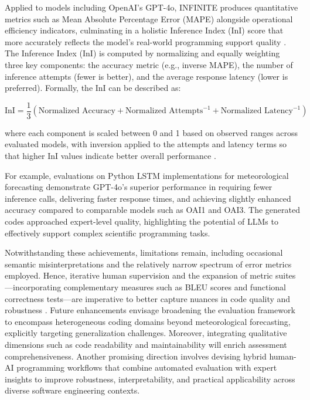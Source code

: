 \documentclass[sigconf]{acmart}
\begin{document}
Applied to models including OpenAI’s GPT-4o, INFINITE produces quantitative metrics such as Mean Absolute Percentage Error (MAPE) alongside operational efficiency indicators, culminating in a holistic Inference Index (InI) score that more accurately reflects the model’s real-world programming support quality \cite{ref9}. The Inference Index (InI) is computed by normalizing and equally weighting three key components: the accuracy metric (e.g., inverse MAPE), the number of inference attempts (fewer is better), and the average response latency (lower is preferred). Formally, the InI can be described as:

\[
\text{InI} = \frac{1}{3} \left( \text{Normalized Accuracy} + \text{Normalized Attempts}^{-1} + \text{Normalized Latency}^{-1} \right)
\]

where each component is scaled between 0 and 1 based on observed ranges across evaluated models, with inversion applied to the attempts and latency terms so that higher InI values indicate better overall performance \cite{ref9}.

For example, evaluations on Python LSTM implementations for meteorological forecasting demonstrate GPT-4o’s superior performance in requiring fewer inference calls, delivering faster response times, and achieving slightly enhanced accuracy compared to comparable models such as OAI1 and OAI3. The generated codes approached expert-level quality, highlighting the potential of LLMs to effectively support complex scientific programming tasks.

Notwithstanding these achievements, limitations remain, including occasional semantic misinterpretations and the relatively narrow spectrum of error metrics employed. Hence, iterative human supervision and the expansion of metric suites—incorporating complementary measures such as BLEU scores and functional correctness tests—are imperative to better capture nuances in code quality and robustness \cite{ref9}. Future enhancements envisage broadening the evaluation framework to encompass heterogeneous coding domains beyond meteorological forecasting, explicitly targeting generalization challenges. Moreover, integrating qualitative dimensions such as code readability and maintainability will enrich assessment comprehensiveness. Another promising direction involves devising hybrid human-AI programming workflows that combine automated evaluation with expert insights to improve robustness, interpretability, and practical applicability across diverse software engineering contexts.
\end{document}
